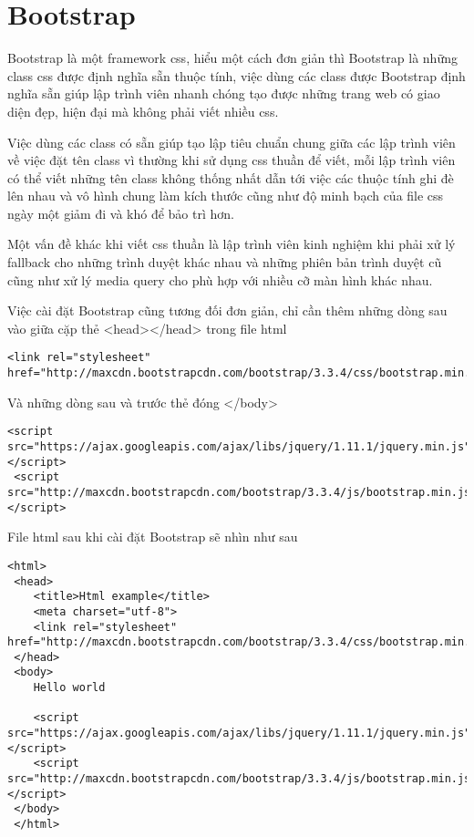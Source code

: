 \section{Bootstrap}
Bootstrap là một framework css, hiểu một cách đơn giản thì Bootstrap là những class css được định nghĩa sẵn thuộc tính, việc dùng các class được Bootstrap định nghĩa sẵn giúp lập trình viên nhanh chóng tạo được những trang web có giao diện đẹp, hiện đại mà không phải viết nhiều css.\par
Việc dùng các class có sẵn giúp tạo lập tiêu chuẩn chung giữa các lập trình viên về việc đặt tên class vì thường khi sử dụng css thuần để viết, mỗi lập trình viên có thể viết những tên class không thống nhất dẫn tới việc các thuộc tính ghi đè lên nhau và vô hình chung làm kích thước cũng như độ minh bạch của file css ngày một giảm đi và khó để bảo trì hơn.\par
Một vấn đề khác khi viết css thuần là lập trình viên kinh nghiệm khi phải xử lý fallback cho những trình duyệt khác nhau và những phiên bản trình duyệt cũ cũng như xử lý media query cho phù hợp với nhiều cỡ màn hình khác nhau.\par
Việc cài đặt Bootstrap cũng tương đối đơn giản, chỉ cần thêm những dòng sau vào giữa cặp thẻ <head></head> trong file html

\lstset{language=Html}
\vspace{-1em}
\begin{lstlisting}[frame=single]
 <link rel="stylesheet" href="http://maxcdn.bootstrapcdn.com/bootstrap/3.3.4/css/bootstrap.min.css">
\end{lstlisting}

Và những dòng sau và trước thẻ đóng </body>

\vspace{-1em}
\begin{lstlisting}[frame=single]
 <script src="https://ajax.googleapis.com/ajax/libs/jquery/1.11.1/jquery.min.js"></script>
 <script src="http://maxcdn.bootstrapcdn.com/bootstrap/3.3.4/js/bootstrap.min.js"></script>
\end{lstlisting}

File html sau khi cài đặt Bootstrap sẽ nhìn như sau

\begin{center}
\vspace{-2em}
\begin{lstlisting}[frame=single]
 <html>
 <head>
    <title>Html example</title>
    <meta charset="utf-8">
    <link rel="stylesheet" href="http://maxcdn.bootstrapcdn.com/bootstrap/3.3.4/css/bootstrap.min.css">
 </head>
 <body>
    Hello world

    <script src="https://ajax.googleapis.com/ajax/libs/jquery/1.11.1/jquery.min.js"></script>
    <script src="http://maxcdn.bootstrapcdn.com/bootstrap/3.3.4/js/bootstrap.min.js"></script>
 </body>
 </html>
\end{lstlisting}
\vspace{-1.5em}
\end{center}

